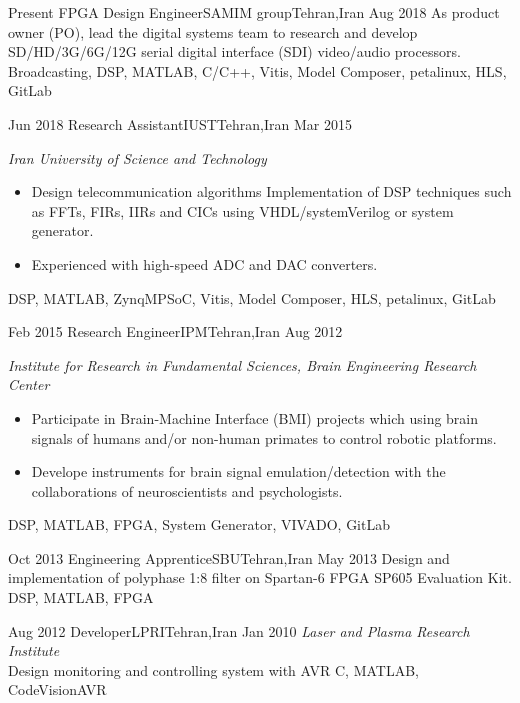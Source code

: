 
\begin{experiences}
  \experience
  {Present} {FPGA Design Engineer}{SAMIM group}{Tehran,Iran}
  {Aug 2018} {
    As product owner (PO), lead the digital systems team to research and develop
    SD/HD/3G/6G/12G serial digital interface (SDI) video/audio processors.
  }
  {Broadcasting, DSP, MATLAB, C/C++, Vitis, Model Composer, petalinux, HLS, GitLab}

  \emptySeparator

  \experience
  {Jun 2018} {Research Assistant}{IUST}{Tehran,Iran}
  {Mar 2015} {
    \emph{Iran University of Science and Technology}
    \begin{itemize}
      \item  Design telecommunication algorithms Implementation of DSP techniques such as
            FFTs, FIRs, IIRs and CICs using VHDL/systemVerilog or system generator.
      \item Experienced with high-speed ADC and DAC converters.
    \end{itemize}
  }
  {DSP, MATLAB, ZynqMPSoC, Vitis, Model Composer, HLS, petalinux, GitLab}

  \emptySeparator

  \experience
  {Feb 2015} {Research Engineer}{IPM}{Tehran,Iran}
  {Aug 2012} {
    \emph{Institute for Research in Fundamental Sciences, Brain Engineering Research Center}
    \begin{itemize}
      \item Participate in Brain-Machine Interface (BMI) projects which using brain signals of humans
            and/or non-human primates to control robotic platforms.
      \item Develope instruments for brain signal emulation/detection with the
            collaborations of neuroscientists and psychologists.
    \end{itemize}
  }
  {DSP, MATLAB, FPGA, System Generator, VIVADO, GitLab}

  \emptySeparator

  \experience
  {Oct 2013} {Engineering Apprentice}{SBU}{Tehran,Iran}
  {May 2013} {
    Design and implementation of polyphase 1:8 filter on Spartan-6 FPGA SP605 Evaluation Kit.
  }
  {DSP, MATLAB, FPGA}

  \emptySeparator

  \experience
  {Aug 2012} {Developer}{LPRI}{Tehran,Iran}
  {Jan 2010} {
    \emph{Laser and Plasma Research Institute}\\
    Design  monitoring and controlling system with AVR
  }
  {C, MATLAB, CodeVisionAVR}
\end{experiences}
